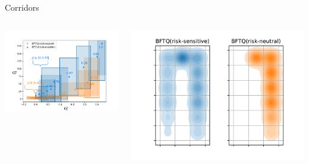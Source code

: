 \documentclass[slideopt,A4,showboxes,svgnames]{beamer}
\begin{document}
\begin{frame}{Corridors}

\begin{columns}
\begin{column}{0.5\linewidth}
\includegraphics[trim={0.5cm 0.1cm 0.7cm 0.2cm}, clip, page=1, width=\linewidth]{../../source/img/corridors}
\end{column}
\begin{column}{0.46\linewidth}
\begin{center}
\href{https://budgeted-rl.github.io/\#risk-sensitive-exploration}{\includegraphics[trim={2cm 0.1cm 1cm 0.5cm}, clip, width=\linewidth]{../../source/img/corridors_densities.pdf}}
\end{center}
\end{column}
\end{columns}
\end{frame}
\end{document}
